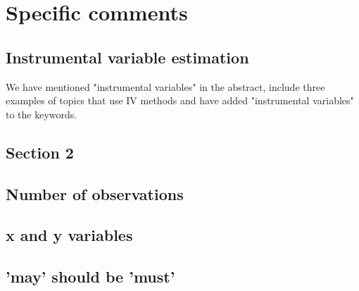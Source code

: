 \documentclass[12pt,english]{scrartcl}
\begin{document}
\section{Specific comments}

\subsection{Instrumental variable estimation}

We have mentioned "instrumental variables" in the abstract, include
three examples of topics that use IV methods and have added
"instrumental variables" to the keywords.

\subsection{Section 2}

\subsection{Number of observations}

\subsection{x and y variables}

\subsection{'may' should be 'must'}
\end{document}
